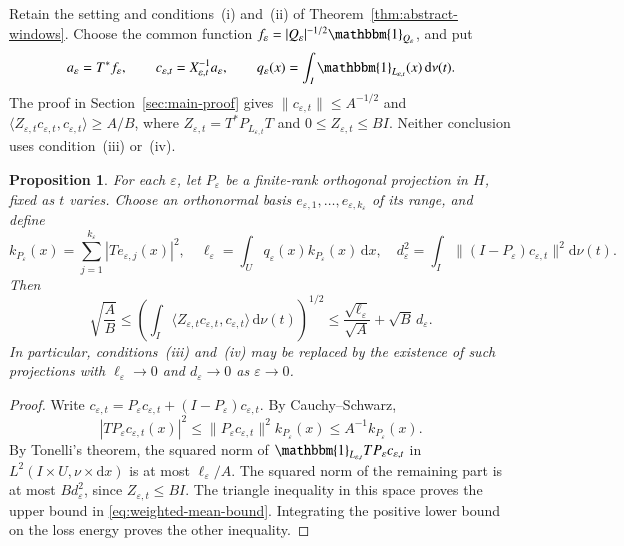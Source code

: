 \documentclass[10pt,a4paper]{amsart}
\newtheorem{proposition}{Proposition}[section]
\def\d{\mathrm{d}}
\newcommand\norm[1]{\|#1\|}
\newcommand\inpro[2]{\langle #1,#2\rangle}
\newcommand\1{\mathbbm{1}}
\newcommand{\eps}{\varepsilon}
\def\d{\mathrm{d}}
\begin{document}
Retain the setting and conditions~(i) and~(ii) of
Theorem~\ref{thm:abstract-windows}. Choose the common function
$f_\eps=|Q_\eps|^{-1/2}\1_{Q_\eps}$, and put
\begin{equation*}
    a_\eps=T^*f_\eps,\qquad c_{\eps,t}=X_{\eps,t}^{-1}a_\eps,
    \qquad q_\eps(x)=\int_I\1_{L_{\eps,t}}(x)\,\d\nu(t).
\end{equation*}
The proof in Section~\ref{sec:main-proof} gives
$\norm{c_{\eps,t}}\le A^{-1/2}$ and
$\inpro{Z_{\eps,t}c_{\eps,t}}{c_{\eps,t}}\ge A/B$, where
$Z_{\eps,t}=T^*P_{L_{\eps,t}}T$ and $0\le Z_{\eps,t}\le BI$.
Neither conclusion uses condition~(iii) or~(iv).

\begin{proposition}\label{prop:weighted-mean}
For each $\eps$, let $P_\eps$ be a finite-rank orthogonal projection in $H$,
fixed as $t$ varies.
Choose an orthonormal basis $e_{\eps,1},\ldots,e_{\eps,k_\eps}$ of its range,
and define
\begin{equation}\label{eq:weighted-quantities}
    k_{P_\eps}(x)=\sum_{j=1}^{k_\eps}|Te_{\eps,j}(x)|^2,\quad
    \ell_\eps=\int_U q_\eps(x)k_{P_\eps}(x)\,\d x,\quad
    d_\eps^2=\int_I\norm{(I-P_\eps)c_{\eps,t}}^2\d\nu(t).
\end{equation}
Then
\begin{equation}\label{eq:weighted-mean-bound}
    \sqrt{\frac AB}
    \le\left(\int_I\inpro{Z_{\eps,t}c_{\eps,t}}{c_{\eps,t}}
       \,\d\nu(t)\right)^{1/2}
    \le\frac{\sqrt{\ell_\eps}}{\sqrt A}+\sqrt B\,d_\eps.
\end{equation}
In particular, conditions~(iii) and~(iv) may be replaced by the existence
of such projections with $\ell_\eps\to0$ and $d_\eps\to0$ as $\eps\to0$.
\end{proposition}
\begin{proof}
Write $c_{\eps,t}=P_\eps c_{\eps,t}+(I-P_\eps)c_{\eps,t}$.
By Cauchy--Schwarz,
\begin{equation*}
    |TP_\eps c_{\eps,t}(x)|^2
    \le\norm{P_\eps c_{\eps,t}}^2 k_{P_\eps}(x)
    \le A^{-1}k_{P_\eps}(x).
\end{equation*}
By Tonelli's theorem, the squared norm of
$\1_{L_{\eps,t}}TP_\eps c_{\eps,t}$ in $L^2(I\times U,\nu\times\d x)$
is at most $\ell_\eps/A$. The squared norm of the remaining part is at most
$Bd_\eps^2$, since $Z_{\eps,t}\le BI$.
The triangle inequality in this space proves the upper bound in
\eqref{eq:weighted-mean-bound}. Integrating the positive lower bound on
the loss energy proves the other inequality.
\end{proof}
\end{document}
